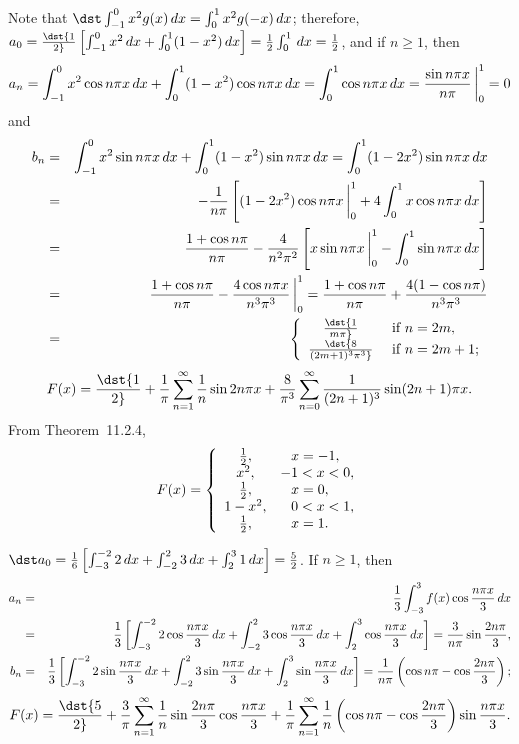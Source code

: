 \documentclass[dvips]{book}
\renewcommand{\exer}[1]{\par\medskip\;\noindent{\color{red}\bf #1.}}
\numberwithin{example}{section}
\numberwithin{equation}{section}
\numberwithin{theorem}{section}
\numberwithin{table}{section}
\numberwithin{figure}{section}
\newcommand{\lims}[2]{\,\bigg|_{#1}^{#2}}
\begin{document}
\exer{11.2.16}
Note that $\dst\int_{-1}^0x^2g(x)\,dx=\int_0^1x^2g(-x)\,dx$;
therefore,
$a_0=\dst{1\over2}\left[\int_{-1}^0x^2\,dx
+\int_0^1(1-x^2)\,dx\right]={1\over2}\int_0^1\,dx=
{1\over2}$, and
if $n\ge1$, then
$$
a_n=\int_{-1}^0x^2\cos n\pi x\,dx
+\int_0^1(1-x^2)\cos n\pi x\,dx=\int_0^1\cos n\pi x\,dx={\sin n\pi x
\over n\pi}\lims01=0
$$
and
\begin{eqnarray*}
 b_n&=&\int_{-1}^0x^2\sin n\pi x\,dx
+\int_0^1(1-x^2)\sin n\pi x\,dx=\int_0^1(1-2x^2)\sin n\pi x\,dx\\
&=&-{1\over n\pi}\left[(1-2x^2)\cos n\pi x\lims01+
4\int_0^1x\cos n\pi x\,dx\right]\\
&=&{1+\cos n\pi\over n\pi}-{4\over n^2\pi^2}\left[x\sin n\pi x\lims01-
\int_0^1\sin n\pi x\,dx\right]\\
&=&{1+\cos n\pi\over n\pi}-{4\cos n\pi x\over n^3\pi^3}\lims01
={1+\cos n\pi\over n\pi}+{4(1-\cos n\pi)\over n^3\pi^3}\\
&=&\left\{\begin{array}{cl}
\dst{1\over m\pi}&\mbox{ if }n=2m,\\
\dst{8\over(2m+1)^3\pi^3}&\mbox{ if }n=2m+1;
\end{array}\right.
\end{eqnarray*}
$$
F(x)=\dst{1\over2}+{1\over\pi}\sum_{n=1}^\infty{1\over n}\sin2n\pi x
+{8\over\pi^3}\sum_{n=0}^\infty{1\over(2n+1)^3}\sin(2n+1)\pi x.
$$
From Theorem~11.2.4,
$$
 F(x)=
\left\{\begin{array}{cl}
{1\over2},&\phantom{-}x=-1,\\
x^2,&-1< x<0,\\
{1\over2},&\phantom{-}x=0,\\
1-x^2,&\phantom{-}0<x<1,\\
{1\over2},&\phantom{-}x=1.
\end{array}\right.
$$



\exer{11.2.18}
$\dst a_0={1\over6}\left[
\int_{-3}^{-2}2\,dx+\int_{-2}^23\,dx+\int_2^31\,dx\right]={5\over2}$.
If $n\ge1$, then
\begin{eqnarray*}
a_n&=&{1\over3}\int_{-3}^3f(x)\cos{n\pi x\over3}\,dx\\
&=&{1\over3}\left[\int_{-3}^{-2}2\cos{n\pi x\over3}\,dx+
\int_{-2}^23\cos{n\pi x\over3}\,dx+\int_2^3\cos{n\pi
x\over3}\,dx\right]=
{3\over n\pi}\sin{2n\pi\over3},\\
b_n&=&{1\over3}\left[\int_{-3}^{-2}2\sin{n\pi x\over3}\,dx+
\int_{-2}^23\sin{n\pi x\over3}\,dx+\int_2^3\sin{n\pi
x\over3}\,dx\right]=
{1\over n\pi}\left(\cos n\pi-\cos{2n\pi\over3}\right);
\end{eqnarray*}
$$
F(x)=\dst{5\over2}+{3\over\pi}\sum_{n=1}^\infty
{1\over n}\sin{2n\pi\over3}\cos{n\pi x\over3}+{1\over\pi}
\sum_{n=1}^\infty {1\over n}\left(\cos
n\pi-\cos{2n\pi\over3}\right)\sin{n\pi x\over3}.
$$
\end{document}
